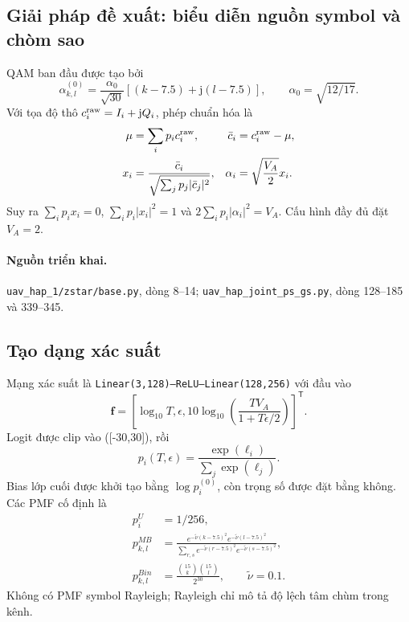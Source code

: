 \subsection{Giải pháp đề xuất: biểu diễn nguồn symbol và chòm sao}

QAM ban đầu được tạo bởi
\begin{equation}
\alpha^{(0)}_{k,l}=\frac{\alpha_0}{\sqrt{30}}
[(k-7.5)+\mathrm{j}(l-7.5)],\qquad \alpha_0=\sqrt{12/17}.
\end{equation}
Với tọa độ thô \(c_i^{\rm raw}=I_i+\mathrm{j}Q_i\), phép chuẩn hóa là
\begin{align}
\mu&=\sum_i p_i c_i^{\rm raw}, & \bar c_i&=c_i^{\rm raw}-\mu,\\
x_i&=\frac{\bar c_i}{\sqrt{\sum_jp_j|\bar c_j|^2}}, &
\alpha_i&=\sqrt{\frac{V_A}{2}}x_i.
\end{align}
Suy ra \(\sum_ip_ix_i=0\), \(\sum_ip_i|x_i|^2=1\) và \(2\sum_ip_i|\alpha_i|^2=V_A\). Cấu hình đầy đủ đặt \(V_A=2\).

\paragraph{Nguồn triển khai.} \texttt{uav\_hap\_1/zstar/base.py}, dòng 8--14; \texttt{uav\_hap\_joint\_ps\_gs.py}, dòng 128--185 và 339--345.

\subsection{Tạo dạng xác suất}

Mạng xác suất là \texttt{Linear(3,128)--ReLU--Linear(128,256)} với đầu vào
\begin{equation}
\mathbf f=\left[\log_{10}T,\epsilon,
10\log_{10}\left(\frac{TV_A}{1+T\epsilon/2}\right)\right]^{\mathsf T}.
\end{equation}
Logit được clip vào ([-30,30]), rồi
\begin{equation}
p_i(T,\epsilon)=\frac{\exp(\ell_i)}{\sum_j\exp(\ell_j)}.
\end{equation}
Bias lớp cuối được khởi tạo bằng \(\log p_i^{(0)}\), còn trọng số được đặt bằng không. Các PMF cố định là
\begin{align}
p^U_i&=1/256,\\
p^{MB}_{k,l}&=\frac{e^{-\tilde\nu(k-7.5)^2}e^{-\tilde\nu(l-7.5)^2}}
{\sum_{r,s}e^{-\tilde\nu(r-7.5)^2}e^{-\tilde\nu(s-7.5)^2}},\\
p^{Bin}_{k,l}&=\frac{\binom{15}{k}\binom{15}{l}}{2^{30}},\qquad \tilde\nu=0.1.
\end{align}
Không có PMF symbol Rayleigh; Rayleigh chỉ mô tả độ lệch tâm chùm trong kênh.

